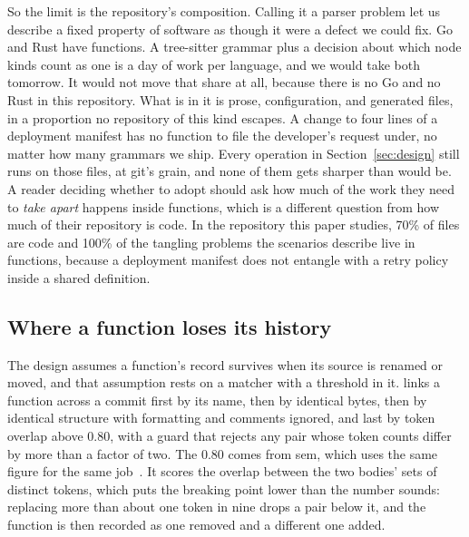 So the limit is the repository's composition. Calling it a parser problem let us describe a fixed property of software as though it were a defect we could fix. Go and Rust have
functions. A tree-sitter grammar plus a decision about which node kinds count as
one is a day of work per language, and we would take both tomorrow. It would not
move that share at all, because there is no Go and no Rust in this repository. What is in it is
prose, configuration, and generated files, in a proportion no repository of this kind
escapes. A change to four lines of a deployment manifest has no function to file the
developer's request under, no matter how many grammars we ship. Every operation in Section~\ref{sec:design}
still runs on those files, at git's grain, and none of them gets sharper than
 would be. A reader deciding whether to adopt \sgt{} should ask how
much of the work they need to \emph{take apart} happens inside functions, which is a
different question from how much of their repository is code. In the repository
this paper studies, 70\% of files are code and 100\% of the tangling problems the
scenarios describe live in functions, because a deployment manifest does not
entangle with a retry policy inside a shared definition.

\subsection{Where a function loses its history}
\label{sec:identity}

The design assumes a function's record survives when its source is renamed or
moved, and that assumption rests on a matcher with a threshold in it. \sgt{} links a function across a commit first by
its name, then by identical bytes, then by identical structure with formatting and
comments ignored, and last by token overlap above 0.80, with a guard that rejects
any pair whose token counts differ by more than a factor of two. The 0.80 comes
from sem, which uses the same figure for the same job~\cite{sem2026}. It scores the
overlap between the two bodies' sets of distinct tokens, which puts the breaking
point lower than the number sounds: replacing more than about one token in nine drops
a pair below it, and the function is then recorded as one removed and a different one
added.

